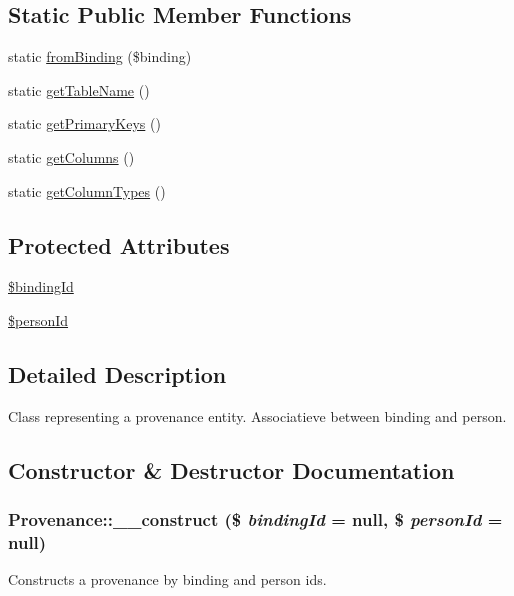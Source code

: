 \subsection*{Static Public Member Functions}
\begin{DoxyCompactItemize}
\item 
static \hyperlink{classProvenance_a7514cb28de3123336f9f0bcc36b0fca7}{fromBinding} (\$binding)
\item 
static \hyperlink{classProvenance_ae8dd5db6f4bdc8c131f625b7e1287827}{getTableName} ()
\item 
static \hyperlink{classProvenance_ad45c3e72c9462e73123e310a49da9154}{getPrimaryKeys} ()
\item 
static \hyperlink{classProvenance_a244657b40cc6b72dd868d25a2cafbe57}{getColumns} ()
\item 
static \hyperlink{classProvenance_a3d14641b8cfcb3dbf226e82d684ab275}{getColumnTypes} ()
\end{DoxyCompactItemize}
\subsection*{Protected Attributes}
\begin{DoxyCompactItemize}
\item 
\hyperlink{classProvenance_a908380e16902473484d18fc79fa65290}{\$bindingId}
\item 
\hyperlink{classProvenance_a0f541d6de88ef1a2c57a0aa462fcdc8b}{\$personId}
\end{DoxyCompactItemize}


\subsection{Detailed Description}
Class representing a provenance entity. Associatieve between binding and person. 

\subsection{Constructor \& Destructor Documentation}
\hypertarget{classProvenance_a12d0b0930da213236d769da23b5b9f9b}{
\subsubsection[{\_\-\_\-construct}]{\setlength{\rightskip}{0pt plus 5cm}Provenance::\_\-\_\-construct (\$ {\em bindingId} = {\ttfamily null}, \/  \$ {\em personId} = {\ttfamily null})}}
\label{classProvenance_a12d0b0930da213236d769da23b5b9f9b}
Constructs a provenance by binding and person ids.


